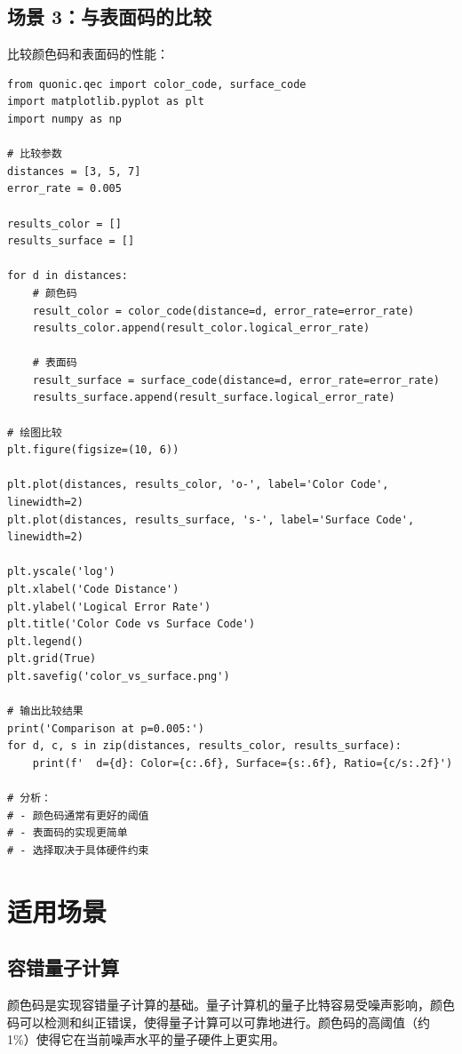 \documentclass[12pt,a4paper]{article}
\begin{document}
\subsection{场景 3：与表面码的比较}

比较颜色码和表面码的性能：

\begin{verbatim}
from quonic.qec import color_code, surface_code
import matplotlib.pyplot as plt
import numpy as np

# 比较参数
distances = [3, 5, 7]
error_rate = 0.005

results_color = []
results_surface = []

for d in distances:
    # 颜色码
    result_color = color_code(distance=d, error_rate=error_rate)
    results_color.append(result_color.logical_error_rate)

    # 表面码
    result_surface = surface_code(distance=d, error_rate=error_rate)
    results_surface.append(result_surface.logical_error_rate)

# 绘图比较
plt.figure(figsize=(10, 6))

plt.plot(distances, results_color, 'o-', label='Color Code', linewidth=2)
plt.plot(distances, results_surface, 's-', label='Surface Code', linewidth=2)

plt.yscale('log')
plt.xlabel('Code Distance')
plt.ylabel('Logical Error Rate')
plt.title('Color Code vs Surface Code')
plt.legend()
plt.grid(True)
plt.savefig('color_vs_surface.png')

# 输出比较结果
print('Comparison at p=0.005:')
for d, c, s in zip(distances, results_color, results_surface):
    print(f'  d={d}: Color={c:.6f}, Surface={s:.6f}, Ratio={c/s:.2f}')

# 分析：
# - 颜色码通常有更好的阈值
# - 表面码的实现更简单
# - 选择取决于具体硬件约束
\end{verbatim}

\section{适用场景}

\subsection{容错量子计算}

颜色码是实现容错量子计算的基础。量子计算机的量子比特容易受噪声影响，颜色码可以检测和纠正错误，使得量子计算可以可靠地进行。颜色码的高阈值（约 1\%）使得它在当前噪声水平的量子硬件上更实用。
\end{document}
